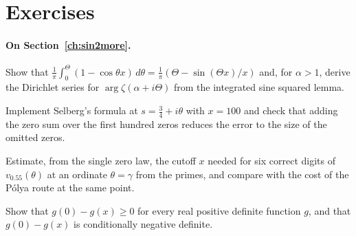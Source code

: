 \section{Exercises}\label{ex:sin2more}

\paragraph{On Section~\ref{ch:sin2more}.}
\begin{exercises}
\item Show that $\frac1\pi\int_0^\Theta(1-\cos\theta x)\,d\theta=\frac1\pi(\Theta-\sin(\Theta x)/x)$ and, for $\alpha>1$, derive the Dirichlet series for $\arg\zeta(\alpha+i\Theta)$ from the integrated sine squared lemma.
\item Implement Selberg's formula at $s=\frac34+i\theta$ with $x=100$ and check that adding the zero sum over the first hundred zeros reduces the error to the size of the omitted zeros.
\item Estimate, from the single zero law, the cutoff $x$ needed for six correct digits of $v_{0.55}(\theta)$ at an ordinate $\theta=\gamma$ from the primes, and compare with the cost of the P\'olya route at the same point.
\item Show that $g(0)-g(x)\ge0$ for every real positive definite function $g$, and that $g(0)-g(x)$ is conditionally negative definite.
\end{exercises}
